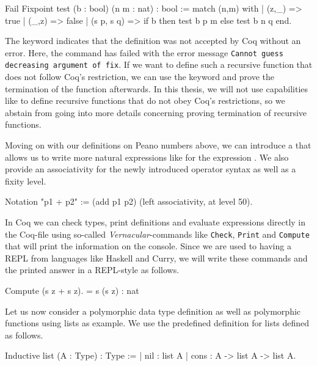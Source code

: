 \begin{coqcode}
Fail Fixpoint test (b : bool) (n m : nat) : bool :=
  match (n,m) with
  | (z,_)      => true
  | (_,z)      => false
  | (s p, s q) => if b then test b p m else test b n q
  end.
\end{coqcode}

The keyword  indicates that the definition was not accepted by Coq without an error.
Here, the command has failed with the error message \texttt{Cannot guess decreasing argument of fix}.
If we want to define such a recursive function that does not follow Coq's restriction, we can use the keyword  and prove the termination of the function afterwards.
In this thesis, we will not use capabilities like  to define recursive functions that do not obey Coq's restrictions, so we abstain from going into more details concerning proving termination of recursive functions.

Moving on with our definitions on Peano numbers above, we can introduce a  that allows us to write more natural expressions like  for the expression .
We also provide an associativity for the newly introduced operator syntax as well as a fixity level.

\begin{coqcode}
Notation "p1 + p2" := (add p1 p2) (left associativity, at level 50).
\end{coqcode}

In Coq we can check types, print definitions and evaluate expressions directly in the Coq\--file using so\--called \emph{Vernacular}\--commands like \texttt{Check}, \texttt{Print} and \texttt{Compute} that will print the information on the console.
Since we are used to having a REPL from languages like Haskell and Curry, we will write these commands and the printed answer in a REPL\--style as follows.

\begin{crepl}
\coqrepl Compute (s z + s z).
   = s (s z)
   : nat
\end{crepl}

Let us now consider a polymorphic data type definition as well as polymorphic functions using lists as example.
We use the predefined definition for lists defined as follows.

\begin{coqcode}
Inductive list (A : Type) : Type :=
| nil  : list A
| cons : A -> list A -> list A.
\end{coqcode}

